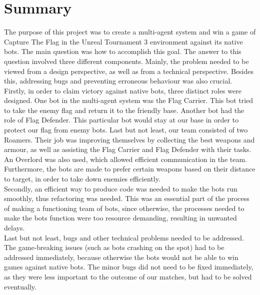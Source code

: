 \chapter*{Summary}
The purpose of this project was to create a multi-agent system and win a game of Capture The Flag in the Unreal Tournament 3 environment against its native bots. The main question was how to accomplish this goal. The answer to this question involved three different components. Mainly, the problem needed to be viewed from a design perspective, as well as from a technical perspective. Besides this, addressing bugs and preventing erroneous behaviour was also crucial. \\

Firstly, in order to claim victory against native bots, three distinct roles were designed. One bot in the multi-agent system was the Flag Carrier. This bot tried to take the enemy flag and return it to the friendly base. Another bot had the role of Flag Defender. This particular bot would stay at our base in order to protect our flag from enemy bots. Last but not least, our team consisted of two Roamers. Their job was improving themselves by collecting the best weapons and armour, as well as assisting the Flag Carrier and Flag Defender with their tasks. An Overlord was also used, which allowed efficient communication in the team. Furthermore, the bots are made to prefer certain weapons based on their distance to target, in order to take down enemies efficiently. \\

Secondly, an efficient way to produce code was needed to make the bots run smoothly, thus refactoring was needed. This was an essential part of the process of making a functioning team of bots, since otherwise, the processes needed to make the bots function were too resource demanding, resulting in unwanted delays. \\

Last but not least, bugs and other technical problems needed to be addressed. The game-breaking issues (such as bots crashing on the spot) had to be addressed immediately, because otherwise the bots would not be able to win games against native bots. The minor bugs did not need to be fixed immediately, as they were less important to the outcome of our matches, but had to be solved eventually. \\